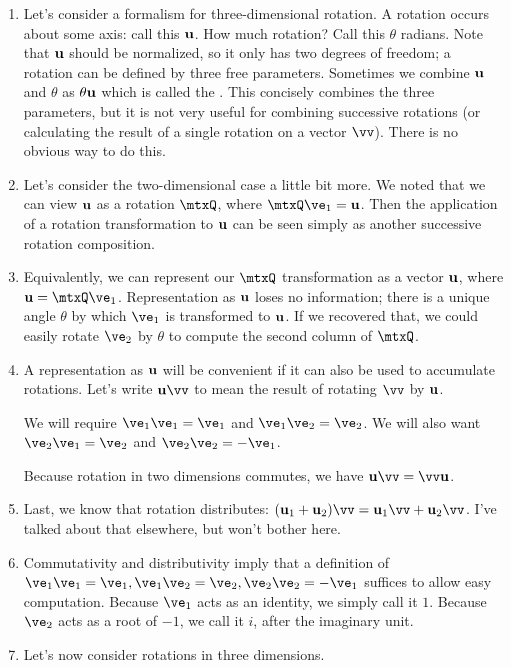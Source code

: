 \documentclass[11pt, oneside]{amsart}
\begin{document}
\begin{enumerate}
  \item Let's consider a formalism for three-dimensional rotation. A
  rotation occurs about some axis: call this $\bm{\mathrm{u}}$. How much rotation?
  Call this $\theta$ radians. Note that $\bm{\mathrm{u}}$ should be normalized, so
  it only has two degrees of freedom; a rotation can be defined by three
  free parameters. Sometimes we combine $\bm{\mathrm{u}}$ and $\theta$ as $\theta
  \bm{\mathrm{u}}$ which is called the . This concisely
  combines the three parameters, but it is not very useful for combining
  successive rotations (or calculating the result of a single rotation
  on a vector $\vv$). There is no obvious way to do this.

  \item Let's consider the two-dimensional case a little bit more. We
  noted that we can view $\bm{\mathrm{u}}$ as a rotation $\mtxQ$, where $\mtxQ \ve_1
  = \vu$. Then the application of a rotation transformation to $\bm{\mathrm{u}}$ can
  be seen simply as another successive rotation composition.

  \item Equivalently, we can represent our $\mtxQ$ transformation as a
  vector $\bm{\mathrm{u}}$, where $\vu = \mtxQ \ve_1$. Representation as $\bm{\mathrm{u}}$ loses
  no information; there is a unique angle $\theta$ by which $\ve_1$ is
  transformed to $\bm{\mathrm{u}}$. If we recovered that, we could easily rotate
  $\ve_2$ by $\theta$ to compute the second column of $\mtxQ$.

  \item A representation as $\bm{\mathrm{u}}$ will be convenient if it can also be
  used to accumulate rotations. Let's write $\vu\vv$ to mean the result
  of rotating $\vv$ by $\bm{\mathrm{u}}$.

  We will require $\ve_1 \ve_1 = \ve_1$ and $\ve_1 \ve_2 = \ve_2$. We
  will also want $\ve_2 \ve_1 = \ve_2$ and $\ve_2 \ve_2 = -\ve_1$.

  Because rotation in two dimensions commutes, we have $\vu\vv =
  \vv\vu$.

  \item Last, we know that rotation distributes: $\parens{\vu_1 +
  \vu_2}\vv = \vu_1\vv + \vu_2\vv$. I've talked about that elsewhere,
  but won't bother here.

  \item Commutativity and distributivity imply that a definition of
  $\ve_1\ve_1 = \ve_1, \ve_1\ve_2 =\ve_2, \ve_2\ve_2=-\ve_1$ suffices to
  allow easy computation. Because $\ve_1$ acts as an identity, we simply
  call it $1$. Because $\ve_2$ acts as a root of $-1$, we call it $i$,
  after the imaginary unit.

  \item Let's now consider rotations in three dimensions.
\end{enumerate}

\end{document}
